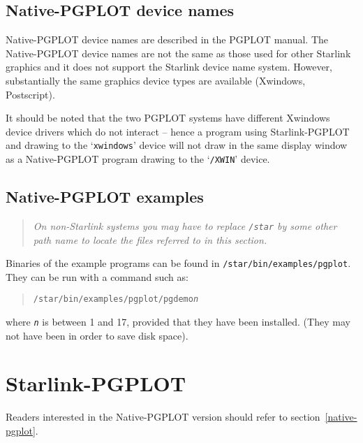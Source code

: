 \documentclass[twoside,11pt]{article}
\newcommand{\htmlref}[2]{#1}
\newcommand{\latexhtml}[2]{#1}
\newcommand{\xlabel}[1]{}
\renewcommand{\_}{\texttt{\symbol{95}}}
\begin{document}
\subsection{\xlabel{native-pgplot_device_names}Native-PGPLOT device names}
\label{native-pgplot_device_names}

Native-PGPLOT device names are described in the PGPLOT manual.  The
Native-PGPLOT device names are not the same as those used for other
Starlink graphics and it does not support the Starlink device name system.
However, substantially the same graphics device types are available
(Xwindows, Postscript).

It should be noted that the two PGPLOT systems have different Xwindows
device drivers which do not interact -- hence a program using
Starlink-PGPLOT and drawing to the `\texttt{xwindows}' device will not draw
in the same display window as a Native-PGPLOT program drawing to the
`\texttt{/XWIN}' device.

\subsection{\xlabel{native_pgplot_examples}Native-PGPLOT examples}
\label{native_pgplot_examples}

\begin{quote}
\emph{ On non-Starlink systems you may have to replace \texttt{/star} by
some other path name to locate the files referred to in this section.}
\end{quote}

Binaries of the example programs can be found in
\texttt{/star/bin/examples/pgplot}.
They can be run with a command such as:

\begin{quote}
\texttt{/star/bin/examples/pgplot/pgdemo{\emph{n}}}
\end{quote}

where \texttt{\emph{n}} is between 1 and 17, provided that they have
been installed.  (They may not have been in order to save disk space).

\section{\xlabel{starlink-pgplot}Starlink-PGPLOT}
\label{starlink-pgplot}

Readers interested in the Native-PGPLOT version should refer to
section~\latexhtml{\ref{native-pgplot}} %
{\htmlref{\emph{Native-PGPLOT}}{native-pgplot}}.
\end{document}
